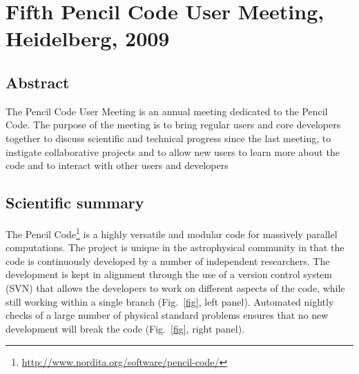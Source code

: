 \documentclass{article}
\begin{document}
\section*{Fifth {\sc Pencil Code} User Meeting, Heidelberg, 2009}

\subsection*{Abstract}

The {\sc Pencil Code} User Meeting is an annual meeting dedicated to the Pencil
Code. The purpose of the meeting is to bring regular users and core
developers together to discuss scientific and technical progress since
the last meeting, to instigate collaborative projects and to allow new
users to learn more about the code and to interact with other users
and developers

\subsection*{Scientific summary}

The Pencil
Code\footnote{\url{http://www.nordita.org/software/pencil-code/}} is a
highly versatile and modular code for massively parallel computations. The
project is unique in the astrophysical community in that the code is
continuously developed by a number of independent researchers. The development
is kept in alignment through the use of a version control system (SVN) that
allows the developers to work on different aspects of the code, while still
working within a single branch (Fig.~\ref{fig}, left panel). Automated nightly checks of a large number of
physical standard problems ensures that no new development will break the
code (Fig.~\ref{fig}, right panel).
\end{document}
